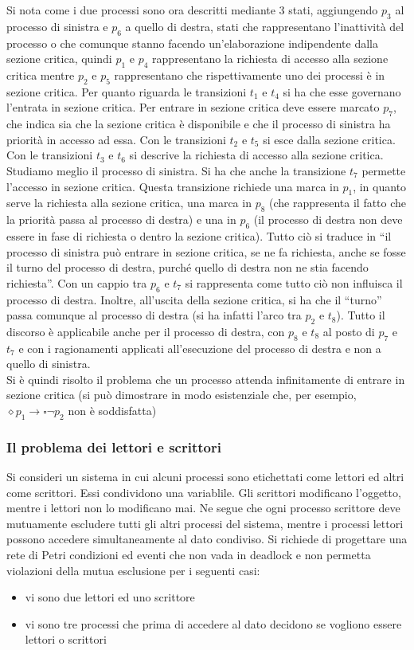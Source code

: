 \documentclass[a4paper,12pt, oneside]{book}
\begin{document}
Si nota come i due processi sono ora descritti mediante 3 stati, aggiungendo
$p_3$ al processo di sinistra e $p_6$ a quello di destra, stati che
rappresentano l'inattività del processo o che comunque stanno facendo
un'elaborazione indipendente dalla sezione critica, quindi $p_1$ e $p_4$
rappresentano la richiesta di accesso alla sezione critica mentre $p_2$ e $p_5$
rappresentano che rispettivamente uno dei processi è in sezione critica. Per
quanto riguarda le transizioni $t_1$ e $t_4$ si ha che esse governano l'entrata
in sezione critica. Per entrare in sezione critica deve essere marcato $p_7$,
che indica sia che la sezione critica è disponibile e che il processo di
sinistra ha priorità in accesso ad essa. Con le transizioni $t_2$ e $t_5$ si
esce dalla sezione critica. Con le transizioni $t_3$ e $t_6$ si descrive la
richiesta di accesso alla sezione critica. Studiamo meglio il processo di
sinistra. Si ha che anche la transizione $t_7$ permette l'accesso in sezione
critica. Questa transizione richiede una marca in $p_1$, in quanto serve
la richiesta alla sezione critica, una marca in $p_8$ (che rappresenta il fatto
che la priorità passa al processo di destra) e una in $p_6$ (il processo di
destra non deve essere in fase di richiesta o dentro la sezione critica). Tutto
ciò si traduce in ``il processo di sinistra può entrare in sezione critica, se
ne fa richiesta, anche se fosse il turno del processo di destra, purché quello
di destra non ne stia facendo richiesta''. Con un cappio tra $p_6$ e $t_7$ si
rappresenta come tutto ciò non influisca il processo di destra. Inoltre,
all'uscita della sezione critica, si ha che il ``turno'' passa comunque al
processo di destra (si ha infatti l'arco tra $p_2$ e $t_8$). Tutto il discorso è
applicabile anche per il processo di destra, con $p_8$ e $t_8$ al posto di $p_7$
e $t_7$ e con i ragionamenti applicati all'esecuzione del processo di destra e
non a quello di sinistra.\\
Si è quindi risolto il problema che un processo attenda infinitamente di entrare
in sezione critica (si può dimostrare in modo esistenziale che, per esempio,
$\diamond p_1\to\square \neg p_2$ non è soddisfatta)
\newpage
\subsubsection{Il problema dei lettori e scrittori}
Si consideri un sistema in cui alcuni processi sono etichettati come lettori ed
altri come scrittori. Essi condividono una variablile. Gli scrittori modificano
l’oggetto, mentre i lettori non lo modificano mai. Ne segue che ogni processo
scrittore deve mutuamente escludere tutti gli altri processi del sistema, mentre
i processi lettori possono accedere simultaneamente al dato condiviso. Si
richiede di progettare una rete di Petri condizioni ed eventi che non vada in
deadlock e non permetta violazioni della mutua esclusione per i seguenti casi: 
\begin{itemize}
  \item vi sono due lettori ed uno scrittore
  \item vi sono tre processi che prima di accedere al dato decidono se vogliono
  essere lettori o scrittori 
\end{itemize}
\end{document}
